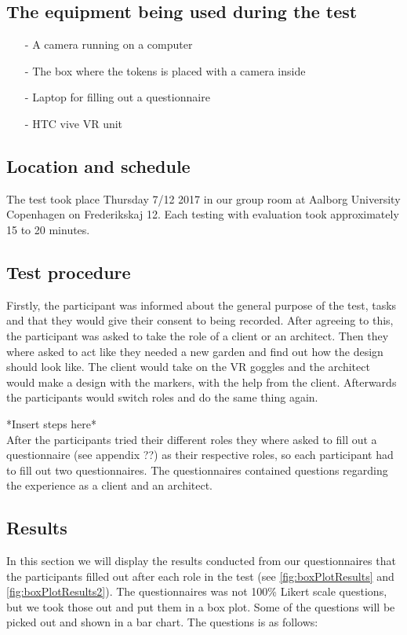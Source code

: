 \subsection*{The equipment being used during the test}
\begin{itemize}
	\item[-] A camera running on a computer
	\item[-] The box where the tokens is placed with a camera inside
	\item[-] Laptop for filling out a questionnaire
	\item[-] HTC vive VR unit
\end{itemize}

\subsection*{Location and schedule}
The test took place Thursday 7/12 2017 in our group room at Aalborg University Copenhagen on Frederikskaj 12. Each testing with evaluation took approximately 15 to 20 minutes.

\subsection*{Test procedure}
Firstly, the participant was informed about the general purpose of the test, tasks and that they would give their consent to being recorded. After agreeing to this, the participant was asked to take the role of a client or an architect. Then they where asked to act like they needed a new garden and find out how the design should look like. The client would take on the VR goggles and the architect would make a design with the markers, with the help from the client. Afterwards the participants would switch roles and do the same thing again.

*Insert steps here*\\

After the participants tried their different roles they where asked to fill out a questionnaire (see appendix ??) as their respective roles, so each participant had to fill out two questionnaires. The questionnaires contained questions regarding the experience as a client and an architect.

\subsection{Results}
In this section we will display the results conducted from our questionnaires that the participants filled out after each role in the test (see \autoref{fig:boxPlotResults} and \autoref{fig:boxPlotResults2}). The questionnaires was not 100\% Likert scale questions, but we took those out and put them in a box plot. Some of the questions will be picked out and shown in a bar chart.
The questions is as follows:\\

